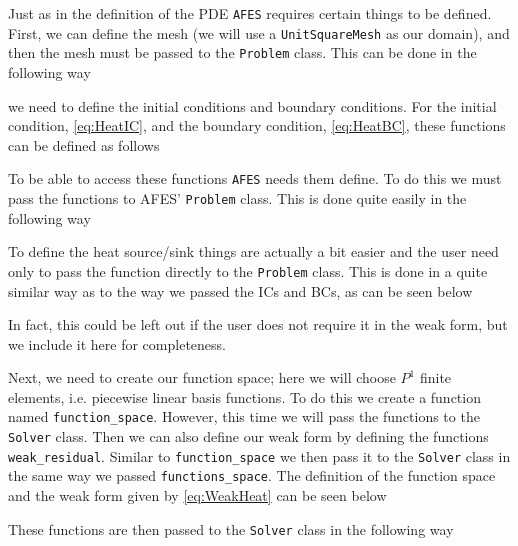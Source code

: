     Just as in the definition of the PDE \texttt{AFES} requires certain things to be
    defined. First, we can define the mesh (we will use a
    \texttt{UnitSquareMesh} as our domain), and then the mesh must be passed to
    the \texttt{Problem} class. This can be done in the following way
    
    we need to define the initial conditions and
    boundary conditions. For the initial condition, \eqref{eq:HeatIC}, and
    the boundary condition, \eqref{eq:HeatBC}, these functions can be defined
    as follows
    
    To be able to access these functions \texttt{AFES} needs them define. To do this we
    must pass the functions to AFES' \texttt{Problem} class. This is done quite
    easily in the following way
    
    To define the heat source/sink things are actually a bit easier and the user
    need only to pass the function directly to the \texttt{Problem} class. This
    is done in a quite similar way as to the way we passed the ICs and BCs, as
    can be seen below
    
    In fact, this could be left out if the user does not require it in the weak
    form, but we include it here for completeness.

    Next, we need to create our function space; here we will choose $P^1$ finite
    elements, i.e. piecewise linear basis functions. To do this we create a
    function named \texttt{function\_space}. However, this time we will pass the
    functions to the \texttt{Solver} class. Then we can also define our weak
    form by defining the functions \texttt{weak\_residual}. Similar to
    \texttt{function\_space} we then pass it to the \texttt{Solver} class in the
    same way we passed \texttt{functions\_space}. The definition of the function
    space and the weak form given by \eqref{eq:WeakHeat} can be seen below
    
    These functions are then passed to the \texttt{Solver} class in the
    following way
    

